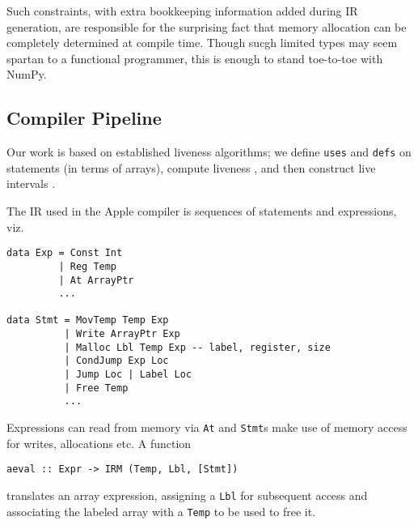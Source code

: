 \documentclass[acmsmall,screen,anonymous,nonacm]{acmart}
\begin{document}

Such constraints, with extra bookkeeping information added during IR generation, are responsible for the surprising fact that memory allocation can be completely determined at compile time. Though sucgh limited types may seem spartan to a functional programmer, this is enough to stand toe-to-toe with NumPy. %


\subsection{Compiler Pipeline}

Our work is based on established liveness algorithms; we define {\tt uses} and {\tt defs} on statements (in terms of arrays), compute liveness \cite[pp.~213-216]{appel1998}, and then construct live intervals \cite{poletto1999}.



The IR used in the Apple compiler is sequences of statements and expressions, viz.

\begin{verbatim}
data Exp = Const Int
         | Reg Temp
         | At ArrayPtr
         ...

data Stmt = MovTemp Temp Exp
          | Write ArrayPtr Exp
          | Malloc Lbl Temp Exp -- label, register, size
          | CondJump Exp Loc
          | Jump Loc | Label Loc
          | Free Temp
          ...
\end{verbatim}

Expressions can read from memory via {\tt At} and {\tt Stmt}s make use of memory access for writes, allocations etc. A function

\begin{verbatim}
aeval :: Expr -> IRM (Temp, Lbl, [Stmt])
\end{verbatim}
translates an array expression, assigning a {\tt Lbl} for subsequent access and associating the labeled array with a {\tt Temp} to be used to free it.
\end{document}
